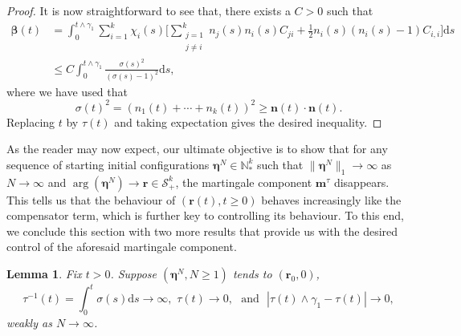 \documentclass[12pt, leqno]{article}
\newtheorem{lemma}{Lemma}
\renewcommand{\eqref}[1]{\hyperref[#1]{(\ref*{#1})}}
\newcommand*{\norm}[1]{\lVert #1 \rVert}
\newcommand{\dd}{{\mathrm d}}
\begin{document}
\begin{proof}
It is now straightforward to see that, there exists a $C>0$ such that 
\begin{align*}
\bm \beta(t) &=\int_0^{t \wedge \gamma_1}\sum_{i=1}^k
 \chi_i(s)\Bigg[ \sum_{\substack{j=1 \\ j\neq i}}^kn_j(s)n_i(s)C_{ji}+\frac{1}{2}n_i(s)(n_i(s)-1)C_{i,i}\Bigg]\dd s\\
&\leq  C \int_0^{t\wedge \gamma_1}\frac{\sigma(s)^2}{(\sigma(s)-1)^2} \dd s,
\end{align*}
where we have used that \[
\sigma(t)^2 = (n_1(t) +\cdots+n_k(t))^2\geq  \bm{n}(t)\cdot \bm{n}(t) .
\]
Replacing $t$ by $\tau(t)$ and taking expectation gives the desired inequality.
\end{proof}


As the reader may now expect, our ultimate objective is to show that for any sequence of starting initial configurations $\bm \eta^N\in \mathbb{N}^k_*$ such that $\norm{\bm \eta^N}_1\to\infty$ as $N\to\infty$ and $\arg(\bm \eta^N)\to \bm r\in \mathcal{S}^k_+$, the   martingale component $\bm m^\tau$ disappears. This tells us that the behaviour of $(\bm r(t), t\geq0)$ behaves increasingly like the compensator term, which is further key to controlling its behaviour.  To this end, we conclude this section with two more results that provide us with the desired control of the aforesaid martingale component.


\begin{lemma}\label{cor1} Fix $t>0$. Suppose $(\bm \eta^N, N\geq 1)$ tends to $( \bm r_0, 0)$,  
\[
\tau^{-1}(t) =   \int^{t}_0 \sigma(s)\dd s \to \infty, \, \,  \tau(t)\to 0,\, \, \text{ and }\,\, |\tau(t)\wedge \gamma_1-\tau(t)|\to0,
\]
weakly as $N\to\infty$.
\end{lemma}
\end{document}
